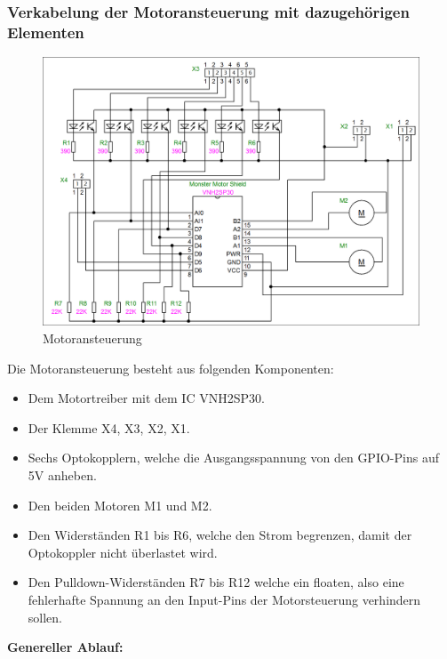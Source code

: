 \subsubsection{Verkabelung der Motoransteuerung mit dazugehörigen Elementen}
\begin{figure}[H] 

\begin{center}

\includegraphics[width=15cm]{Bilder/Schaltplan/Motoransteuerung}
\caption{Motoransteuerung}
\label{Motoransteuerung}
\end{center}
\end{figure}
Die Motoransteuerung besteht aus folgenden Komponenten:\\
\begin{itemize}
\item Dem Motortreiber mit dem IC VNH2SP30.
\item Der Klemme X4, X3, X2, X1.
\item Sechs Optokopplern, welche die Ausgangsspannung von den GPIO-Pins auf 5V anheben.
\item Den beiden Motoren M1 und M2.
\item Den Widerständen R1 bis R6, welche den Strom begrenzen, damit der Optokoppler nicht überlastet wird.
\item Den Pulldown-Widerständen R7 bis R12 welche ein floaten, also eine fehlerhafte Spannung an den Input-Pins der Motorsteuerung verhindern sollen. \\
\end{itemize}
\newpage
\textbf{Genereller Ablauf:}
